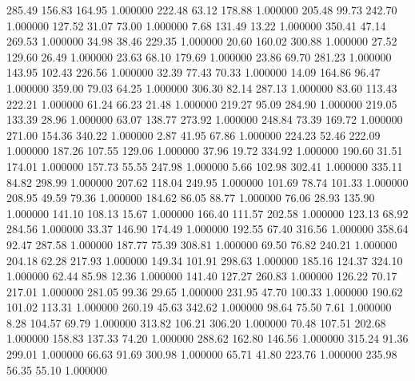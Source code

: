     285.49    156.83    164.95  1.000000
    222.48     63.12    178.88  1.000000
    205.48     99.73    242.70  1.000000
    127.52     31.07     73.00  1.000000
      7.68    131.49     13.22  1.000000
    350.41     47.14    269.53  1.000000
     34.98     38.46    229.35  1.000000
     20.60    160.02    300.88  1.000000
     27.52    129.60     26.49  1.000000
     23.63     68.10    179.69  1.000000
     23.86     69.70    281.23  1.000000
    143.95    102.43    226.56  1.000000
     32.39     77.43     70.33  1.000000
     14.09    164.86     96.47  1.000000
    359.00     79.03     64.25  1.000000
    306.30     82.14    287.13  1.000000
     83.60    113.43    222.21  1.000000
     61.24     66.23     21.48  1.000000
    219.27     95.09    284.90  1.000000
    219.05    133.39     28.96  1.000000
     63.07    138.77    273.92  1.000000
    248.84     73.39    169.72  1.000000
    271.00    154.36    340.22  1.000000
      2.87     41.95     67.86  1.000000
    224.23     52.46    222.09  1.000000
    187.26    107.55    129.06  1.000000
     37.96     19.72    334.92  1.000000
    190.60     31.51    174.01  1.000000
    157.73     55.55    247.98  1.000000
      5.66    102.98    302.41  1.000000
    335.11     84.82    298.99  1.000000
    207.62    118.04    249.95  1.000000
    101.69     78.74    101.33  1.000000
    208.95     49.59     79.36  1.000000
    184.62     86.05     88.77  1.000000
     76.06     28.93    135.90  1.000000
    141.10    108.13     15.67  1.000000
    166.40    111.57    202.58  1.000000
    123.13     68.92    284.56  1.000000
     33.37    146.90    174.49  1.000000
    192.55     67.40    316.56  1.000000
    358.64     92.47    287.58  1.000000
    187.77     75.39    308.81  1.000000
     69.50     76.82    240.21  1.000000
    204.18     62.28    217.93  1.000000
    149.34    101.91    298.63  1.000000
    185.16    124.37    324.10  1.000000
     62.44     85.98     12.36  1.000000
    141.40    127.27    260.83  1.000000
    126.22     70.17    217.01  1.000000
    281.05     99.36     29.65  1.000000
    231.95     47.70    100.33  1.000000
    190.62    101.02    113.31  1.000000
    260.19     45.63    342.62  1.000000
     98.64     75.50      7.61  1.000000
      8.28    104.57     69.79  1.000000
    313.82    106.21    306.20  1.000000
     70.48    107.51    202.68  1.000000
    158.83    137.33     74.20  1.000000
    288.62    162.80    146.56  1.000000
    315.24     91.36    299.01  1.000000
     66.63     91.69    300.98  1.000000
     65.71     41.80    223.76  1.000000
    235.98     56.35     55.10  1.000000
